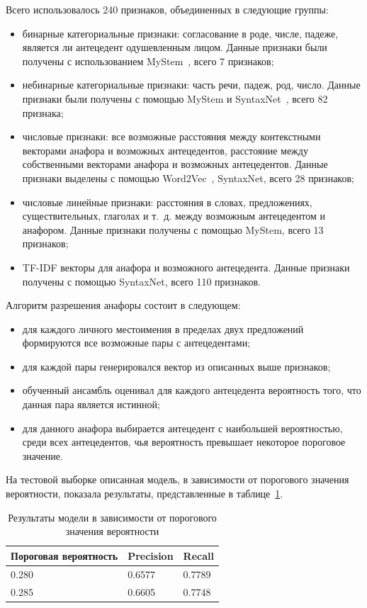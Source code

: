 Всего использовалось 240 признаков, объединенных в следующие группы:
\begin{itemize}
	\item бинарные категориальные признаки: согласование в роде, числе, падеже, является ли антецедент одушевленным лицом. Данные признаки были получены с использованием MyStem~\cite{yandexMystemDoc}, всего 7 признаков;
	\item небинарные категориальные признаки: часть речи, падеж, род, число. Данные признаки были получены с помощью MyStem и SyntaxNet~\cite{Petrov2016SyntaxNet}, всего 82 признака;
	\item числовые признаки: все возможные расстояния между контекстными векторами анафора и возможных антецедентов, расстояние между собственными векторами анафора и возможных антецедентов. Данные признаки выделены с помощью Word2Vec~\cite{mikolov2013distributedrepresentationswordsphrases}, SyntaxNet, всего 28 признаков;
	\item числовые линейные признаки: расстояния в словах, предложениях, существительных, глаголах и т.~д. между возможным антецедентом и анафором. Данные признаки получены с помощью MyStem, всего 13 признаков;
	\item TF-IDF векторы для анафора и возможного антецедента. Данные признаки получены с помощью SyntaxNet, всего 110 признаков.
\end{itemize}

Алгоритм разрешения анафоры состоит в следующем:
\begin{itemize}
	\item для каждого личного местоимения в пределах двух предложений формируются все возможные пары с антецедентами;
	\item для каждой пары генерировался вектор из описанных выше признаков;
	\item обученный ансамбль оценивал для каждого антецедента вероятность того, что данная пара является истинной;
	\item для данного анафора выбирается антецедент с наибольшей вероятностью, среди всех антецедентов, чья вероятность превышает некоторое пороговое значение. 
\end{itemize}

На тестовой выборке описанная модель, в зависимости от порогового значения вероятности, показала результаты, представленные в таблице~\ref{tab:decision_trees_resut}. 

\begin{table}[H]
	\centering
	\caption{Результаты модели в зависимости от порогового значения вероятности}
	\begin{tabular}{|c|c|c|}
		\hline 
		Пороговая вероятность & Precision & Recall \\
		\hline
		\multicolumn{1}{|l}{0.280} & \multicolumn{1}{|l}{0.6577} & \multicolumn{1}{|l|}{0.7789} \\\hline
		\multicolumn{1}{|l}{0.285} & \multicolumn{1}{|l}{0.6605} & \multicolumn{1}{|l|}{0.7748} \\\hline
	\end{tabular}
	\label{tab:decision_trees_resut}
\end{table}

